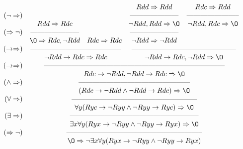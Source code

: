 \documentclass[11pt, a4paper]{article}
\newcommand{\n}{\wedge}
\begin{document}
\renewcommand{\arraystretch}{.5}
\[\begin{array}{r c c c c}
    & & & Rdd \Rightarrow Rdd & Rdc \Rightarrow Rdd \\
    (\neg \Rightarrow) & & & \text{---------------------} & \text{-----------------------} \\
    & Rdd \Rightarrow Rdc & & \neg Rdd, Rdd \Rightarrow \O & \neg Rdd, Rdc \Rightarrow \O \\
    (\Rightarrow \neg) & \text{---------------------} & & \text{---------------------} & \\
    & \O \Rightarrow Rdc, \neg Rdd & Rdc \Rightarrow Rdc & \neg Rdd \Rightarrow \neg Rdd & \\
    (\rightarrow \Rightarrow) & \multicolumn{2}{c}{ \text{---------------------------------------}} & \multicolumn{2}{c}{ \text{---------------------------------------------}} \\
    & \multicolumn{2}{c}{ \neg Rdd \rightarrow Rdc \Rightarrow Rdc } & \multicolumn{2}{c}{ \neg Rdd \rightarrow Rdc, \neg Rdd \Rightarrow \O }\\
    (\rightarrow \Rightarrow) & \multicolumn{4}{c}{ \text{------------------------------------------------------------------------------}} \\
    & \multicolumn{4}{c}{ Rdc \rightarrow \neg Rdd, \neg Rdd \rightarrow Rdc \Rightarrow \O } \\
    (\n \Rightarrow) & \multicolumn{4}{c}{ \text{------------------------------------------------}} \\
    & \multicolumn{4}{c}{ (Rdc \rightarrow \neg Rdd \n \neg Rdd \rightarrow Rdc) \Rightarrow \O } \\
    (\forall \Rightarrow) & \multicolumn{4}{c}{ \text{------------------------------------------------------}} \\
    & \multicolumn{4}{c}{ \forall y (Ryc \rightarrow \neg Ryy \n \neg Ryy \rightarrow Ryc) \Rightarrow \O } \\
    (\exists \Rightarrow) & \multicolumn{4}{c}{ \text{--------------------------------------------------------}} \\
    & \multicolumn{4}{c}{ \exists x \forall y (Ryx \rightarrow \neg Ryy \n \neg Ryy \rightarrow Ryx) \Rightarrow \O } \\
    (\Rightarrow \neg) & \multicolumn{4}{c}{ \text{-----------------------------------------------------------}} \\
    & \multicolumn{4}{c}{ \O \Rightarrow \neg \exists x \forall y (Ryx \rightarrow \neg Ryy \n \neg Ryy \rightarrow Ryx) } \\
\end{array}\]
\end{document}
